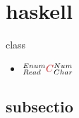 \documentclass{article}
\begin{document}
\section{haskell}
class
\begin{itemize}
  \item $^{Enum}_{Read}{\huge \color{red}{C}}^{Num}_{Char}$
\end{itemize}
\subsection{subsectio} 
\end{document}
